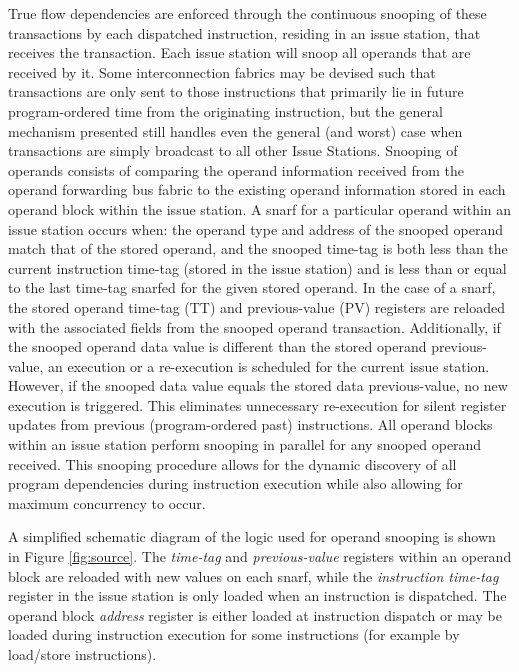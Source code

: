 \documentclass[10pt,dvips]{article}
\begin{document}
True flow dependencies are enforced through the continuous snooping of
these transactions by each dispatched instruction, residing in an issue
station, that receives the transaction.
Each issue station will snoop all operands that are received by it.
Some 
interconnection fabrics may be devised such that
transactions are only sent to those instructions that primarily
lie in future program-ordered time from the originating instruction,
but the general mechanism presented 
still handles even the general (and worst)
case when transactions are simply broadcast to all other Issue Stations.  
Snooping of operands consists of comparing the operand information
received from the operand forwarding bus fabric to the existing
operand information stored in each operand block within the
issue station.
A snarf for a particular operand
within an issue station occurs when: the operand type and address
of the snooped operand match that of the stored operand, and
the snooped time-tag is both less than the current instruction
time-tag (stored in the issue station) and is less than or
equal to the last time-tag snarfed for the given stored operand.
In the case of a snarf, the stored operand time-tag (TT) and
previous-value (PV) registers are reloaded with the associated
fields from the snooped operand transaction.
Additionally, if the snooped operand data value is different
than the stored operand previous-value, an execution or a re-execution
is scheduled for the current issue station.
However, if the snooped data value equals the stored
data previous-value, no new execution is triggered.
This eliminates unnecessary re-execution for silent register updates
from previous (program-ordered past) instructions.
All operand blocks within an issue station perform snooping
in parallel for any snooped operand received.
This snooping procedure allows for the dynamic discovery of
all program dependencies during instruction execution while 
also allowing for maximum concurrency to occur.

A simplified schematic diagram of the logic used for operand snooping
is shown in Figure \ref{fig:source}.
The {\em time-tag} and
{\em previous-value} registers within an operand block
are reloaded with new values on each snarf,
while the
{\em instruction time-tag} register in the issue station
is only loaded when an instruction is dispatched.
The operand block {\em address} register is either loaded at instruction
dispatch or may be loaded during instruction execution for some
instructions
(for example by load/store instructions).
%
\begin{figure*}
\centering
\scriptsize {
}
\caption{{\em Snooping logic for operand updates.} 
The snooping
logic for one of several possible source operands is shown.
This logic would reside in each of the operand blocks within an 
issue station and they would all perform the snoop operation
simultaneously.
Just one operand forwarding bus is shown being snooped but
typically several forwarding buses are snooped simultaneously.}
\label{fig:source}
\end{figure*}
%
%
\vspace{-0.15in}
\end{document}
